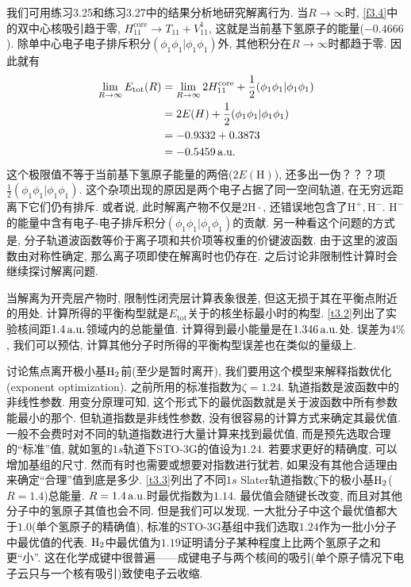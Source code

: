 我们可用练习3.25和练习3.27中的结果分析地研究解离行为. 当$R\to\infty$时, \ref{f3.4}中的双中心核吸引趋于零, $H_{11}^\mathrm{core}\to T_{11}+V_{11}^1$, 这就是当前基下氢原子的能量($-0.4666$). 除单中心电子电子排斥积分$(\phi_1\phi_1|\phi_1\phi_1)$外, 其他积分在$R\to \infty$时都趋于零. 因此就有
\begin{align*}
\lim_{R\to\infty} E_\mathrm{tot}(R) & = \lim_{R\to\infty} 2H_{11}^\mathrm{core} + \frac{1}{2}(\phi_1\phi_1|\phi_1\phi_1)\\
& = 2E(H) + \frac{1}{2}(\phi_1\phi_1|\phi_1\phi_1)\\
& = -0.9332 + 0.3873\\
& = -0.5459\,\mathrm{a.u.}
\end{align*}
这个极限值不等于当前基下氢原子能量的两倍($2E(\mathrm{H})$), 还多出一伪？？？项$\frac{1}{2}(\phi_1\phi_1|\phi_1\phi_1)$. 这个杂项出现的原因是两个电子占据了同一空间轨道, 在无穷远距离下它们仍有排斥. 或者说, 此时解离产物不仅是$2\mathrm{H}\cdot$, 还错误地包含了$\mathrm{H}^+,\mathrm{H}^-$. $\mathrm{H}^-$的能量中含有电子-电子排斥积分$(\phi_1\phi_1|\phi_1\phi_1)$的贡献. 另一种看这个问题的方式是, 分子轨道波函数等价于离子项和共价项等权重的价键波函数. 由于这里的波函数由对称性确定, 那么离子项即使在解离时也仍存在. 之后讨论非限制性\hft 计算时会继续探讨解离问题.

当解离为开壳层产物时, 限制性闭壳层\hft 计算表象很差, 但这无损于其在平衡点附近的用处. 计算所得的平衡构型就是$E_\mathrm{tot}$关于的核坐标最小时的构型. \ref{t3.2}列出了实验核间距$1.4\,\mathrm{a.u.}$领域内的总能量值. 计算得到最小能量是在$1.346\,\mathrm{a.u.}$处. 误差为$4\%$, 我们可以预估, 计算其他分子时所得的平衡构型误差也在类似的量级上. 

讨论焦点离开极小基$\mathrm{H}_2$前(至少是暂时离开), 我们要用这个模型来解释指数优化(exponent optimization). 之前所用的标准指数为$\zeta=1.24$. 轨道指数是波函数中的非线性参数. 用变分原理可知, 这个形式下的最优函数就是关于波函数中所有参数能最小的那个. 但轨道指数是非线性参数, 没有很容易的计算方式来确定其最优值. 一般不会费时对不同的轨道指数进行大量计算来找到最优值, 而是预先选取合理的``标准''值, 就如氢的$1s$轨道下STO-3G的值设为$1.24$. 若要求更好的精确度, 可以增加基组的尺寸. 然而有时也需要或想要对指数进行犹若, 如果没有其他合适理由来确定``合理''值到底是多少. \ref{t3.3}列出了不同$1s$ Slater轨道指数$\zeta$下的极小基$\mathrm{H}_2$($R=1.4$)总能量. $R=1.4\,\mathrm{a.u.}$时最优指数为$1.14$. 最优值会随键长改变, 而且对其他分子中的氢原子其值也会不同. 但是我们可以发现, 一大批分子中这个最优值都大于$1.0$(单个氢原子的精确值), 标准的STO-3G基组中我们选取$1.24$作为一批小分子中最优值的代表. $\mathrm{H}_2$中最优值为$1.19$证明请分子某种程度上比两个氢原子之和更``小”. 这在化学成键中很普遍——成键电子与两个核间的吸引(单个原子情况下电子云只与一个核有吸引)致使电子云收缩. 
